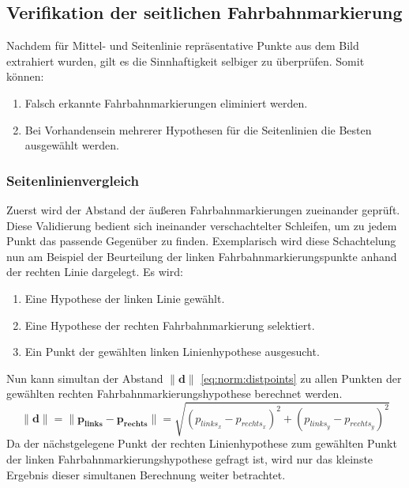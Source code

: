 \subsection{Verifikation der seitlichen Fahrbahnmarkierung}
Nachdem für Mittel- und Seitenlinie repräsentative Punkte aus dem Bild extrahiert wurden, gilt es die Sinnhaftigkeit selbiger zu überprüfen. Somit können:
\begin{enumerate}
\item Falsch erkannte Fahrbahnmarkierungen eliminiert werden.
\item Bei Vorhandensein mehrerer Hypothesen für die Seitenlinien die Besten ausgewählt werden.
\end{enumerate}

\subsubsection{Seitenlinienvergleich} 
\label{sssec:fahrspurerkennung:riverflow:verifikation:seitenlinienvergleich}
Zuerst wird der Abstand der äußeren Fahrbahnmarkierungen zueinander geprüft. Diese Validierung bedient sich ineinander verschachtelter Schleifen, um zu jedem Punkt das passende Gegenüber zu finden. Exemplarisch wird diese Schachtelung nun am Beispiel der Beurteilung der linken Fahrbahnmarkierungspunkte anhand der rechten Linie dargelegt. Es wird:
\begin{enumerate}
\item 
Eine Hypothese der linken Linie gewählt.
\item \label{item:riverflow:verification:l_r:loops:right_hypo}
Eine Hypothese der rechten Fahrbahnmarkierung selektiert.
\item \label{item:riverflow:verification:l_r:loops:point}
Ein Punkt der gewählten linken Linienhypothese ausgesucht.
\end{enumerate}
Nun kann simultan der Abstand \begin{math} \| \boldsymbol{d} \| \end{math} \eqref{eq:norm:distpoints} 
zu allen Punkten der gewählten rechten Fahrbahnmarkierungshypothese berechnet werden. 
\begin{equation}
\label{eq:norm:distpoints} 
\| \boldsymbol{d} \| = \| \boldsymbol{p_{links} - p_{rechts}} \|=  
\sqrt{(p_{links_x}-p_{rechts_x})^2 + (p_{links_y}-p_{rechts_y})^2}
\end{equation}
Da der nächstgelegene Punkt der rechten Linienhypothese zum gewählten Punkt der linken Fahrbahnmarkierungshypothese gefragt ist, wird nur das kleinste Ergebnis dieser simultanen Berechnung weiter betrachtet.

